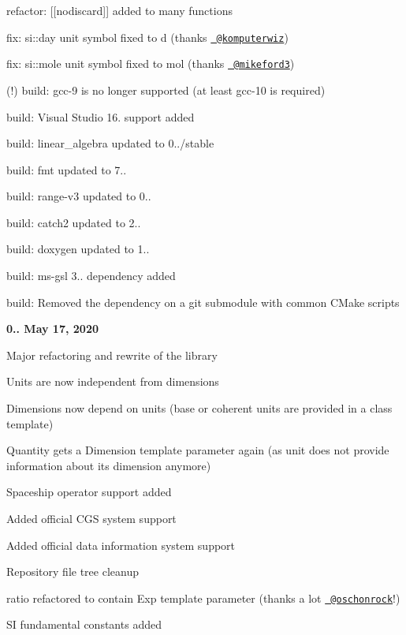 \begin{DoxyItemize}
\begin{DoxyItemize}
\item refactor\+: {\ttfamily \mbox{[}\mbox{[}nodiscard\mbox{]}\mbox{]}} added to many functions
\item fix\+: {\ttfamily si\+::day} unit symbol fixed to {\ttfamily d} (thanks \href{https://github.com/komputerwiz}{\texttt{ @komputerwiz}})
\item fix\+: {\ttfamily si\+::mole} unit symbol fixed to {\ttfamily mol} (thanks \href{https://github.com/mikeford3}{\texttt{ @mikeford3}})
\item (!) build\+: gcc-\/9 is no longer supported (at least gcc-\/10 is required)
\item build\+: Visual Studio 16. support added
\item build\+: linear\+\_\+algebra updated to 0../stable
\item build\+: fmt updated to 7..
\item build\+: range-\/v3 updated to 0..
\item build\+: catch2 updated to 2..
\item build\+: doxygen updated to 1..
\item build\+: ms-\/gsl 3.. dependency added
\item build\+: Removed the dependency on a git submodule with common CMake scripts
\end{DoxyItemize}
\item {\bfseries{0.. May 17, 2020}}
\begin{DoxyItemize}
\item Major refactoring and rewrite of the library
\item Units are now independent from dimensions
\item Dimensions now depend on units (base or coherent units are provided in a class template)
\item Quantity gets a Dimension template parameter again (as unit does not provide information about its dimension anymore)
\item Spaceship operator support added
\item Added official CGS system support
\item Added official data information system support
\item Repository file tree cleanup
\item {\ttfamily ratio} refactored to contain {\ttfamily Exp} template parameter (thanks a lot \href{https://github.com/oschonrock}{\texttt{ @oschonrock}}!)
\item SI fundamental constants added

\end{DoxyItemize}
\end{DoxyItemize}
